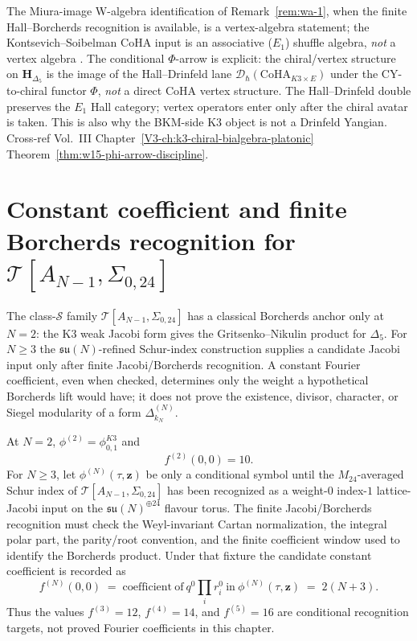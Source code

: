 \begin{remark}
\label{rem:wa-4-supplement}
The Miura-image W-algebra identification of
Remark~\ref{rem:wa-1}, when the finite Hall--Borcherds recognition is
available, is a vertex-algebra statement; the
Kontsevich--Soibelman CoHA input is an associative ($E_1$) shuffle
algebra, \emph{not} a vertex algebra \cite{KontsevichSoibelman2011}.
The conditional $\Phi$-arrow is explicit: the chiral/vertex
structure on $\mathbf H_{\Delta_5}$ is the image of the
Hall--Drinfeld lane
$\mathcal D_\hbar(\mathrm{CoHA}_{K3\times E})$ under the
CY-to-chiral functor $\Phi$, \emph{not} a direct CoHA vertex
structure. The Hall--Drinfeld double preserves the $E_1$ Hall
category; vertex operators enter only after the chiral avatar is
taken. This is also why the BKM-side K3 object is not a Drinfeld
Yangian.
Cross-ref Vol.~III
Chapter~\ref{V3-ch:k3-chiral-bialgebra-platonic}
Theorem~\ref{thm:w15-phi-arrow-discipline}.
\end{remark}


\section{Constant coefficient and finite Borcherds recognition for
$\mathcal T[A_{N-1}, \Sigma_{0,24}]$}
\label{sec:wa-supplement-iii}

The class-$\mathcal S$ family
$\mathcal T[A_{N-1}, \Sigma_{0,24}]$ has a classical Borcherds anchor
only at $N=2$: the K3 weak Jacobi form gives the Gritsenko--Nikulin
product for $\Delta_5$. For $N \ge 3$ the $\mathfrak{su}(N)$-refined
Schur-index construction supplies a candidate Jacobi input only after
finite Jacobi/Borcherds recognition. A constant Fourier coefficient,
even when checked, determines only the weight a hypothetical Borcherds
lift would have; it does not prove the existence, divisor, character, or
Siegel modularity of a form $\Delta_{k_N}^{(N)}$.

\begin{proposition}[constant coefficient at $N=2$ and conditional
 $N$-fixture; \ClaimStatusConditional]
\label{prop:wa-f-constant}
At $N=2$, $\phi^{(2)}=\phi_{0,1}^{K3}$ and
\[
 f^{(2)}(0,0)=10.
\]
For $N\ge 3$, let $\phi^{(N)}(\tau,\mathbf z)$ be only a conditional
symbol until the $M_{24}$-averaged Schur index of
$\mathcal T[A_{N-1},\Sigma_{0,24}]$ has been recognized as a
weight-$0$ index-$1$ lattice-Jacobi input on the
$\mathfrak{su}(N)^{\oplus 24}$ flavour torus. The finite
Jacobi/Borcherds recognition must check the Weyl-invariant Cartan
normalization, the integral polar part, the parity/root convention, and
the finite coefficient window used to identify the Borcherds product.
Under that fixture the candidate constant coefficient is recorded as
\[
 f^{(N)}(0, 0)
 \;=\;
 \mathrm{coefficient\ of\ } q^0 \prod_i r_i^0 \mathrm{\ in\ }
 \phi^{(N)}(\tau, \mathbf z)
 \;=\; 2(N + 3).
\]
Thus the values $f^{(3)}=12$, $f^{(4)}=14$, and $f^{(5)}=16$ are
conditional recognition targets, not proved Fourier coefficients in
this chapter.
\end{proposition}

